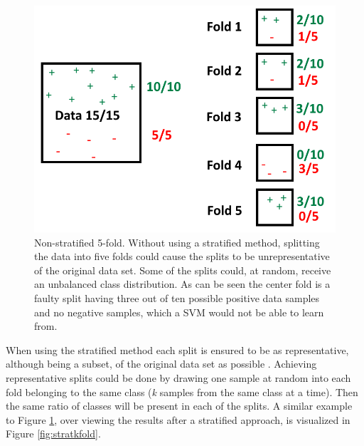 \documentclass[a4paper,twoside]{bth}
\begin{document}
\begin{figure}
\centering
\includegraphics[scale=0.65]{images/metod-images/kfold_normal_fold.png}
   \caption{Non-stratified 5-fold. Without using a stratified method, splitting the data into five folds could cause the splits to be unrepresentative of the original data set. Some of the splits could, at random, receive an unbalanced class distribution. As can be seen the center fold is a faulty split having three out of ten possible positive data samples and no negative samples, which a SVM would not be able to learn from.}
   \label{fig:normkfold}
\end{figure}


\par When using the stratified method each split is ensured to be as representative, although being a subset, of the original data set as possible \cite{Flach:2012:MLA:2490546, Japkowicz:2011}. Achieving representative splits could be done by drawing one sample at random into each fold belonging to the same class (\textit{k} samples from the same class at a time). Then the same ratio of classes will be present in each of the splits. A similar example to Figure \ref{fig:normkfold}, over viewing the results after a stratified approach, is visualized in Figure \ref{fig:stratkfold}.
\end{document}
